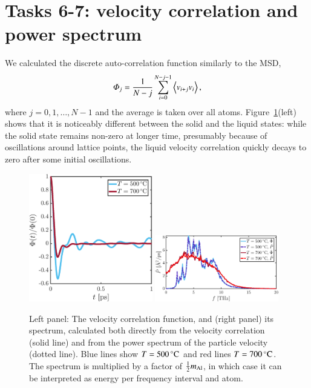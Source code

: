 

\section*{Tasks 6-7: velocity correlation and power spectrum}

We calculated the discrete auto-correlation function similarly to the
MSD, 
\begin{equation}
\varPhi_j = \frac{1}{N-j}\sum_{i=0}^{N-j-1} \ev{v_{i+j}v_{i}}, \label{eq:Phi}
\end{equation}
where $j=0,1,\ldots,N-1$ and the average is taken over all atoms. Figure~\ref{fig:spectrum}(left) shows that it is noticeably different between the solid and the liquid states: while the solid state remains non-zero at longer time, presumably because of oscillations around lattice points, the liquid velocity correlation quickly decays to zero after some initial oscillations. 

\begin{figure}[!ht]
\begin{center}
  \includegraphics[width=0.48\textwidth]{../figures/Phi-t} 
    \includegraphics[width=0.48\textwidth]{../figures/P-freq} 
  \caption{Left panel: The velocity correlation function, and (right panel) its spectrum, calculated both directly from the velocity correlation (solid line) and from the power spectrum of the particle velocity (dotted line). Blue lines show $T=\unit[500]{^\circ C}$ and red lines $T=\unit[700]{^\circ C}$. The spectrum is multiplied by a factor of $\tfrac{1}{2} m_{\rm Al}$, in which case it can be interpreted as energy per frequency interval and atom. }
  \label{fig:spectrum}
\end{center}
\end{figure}


